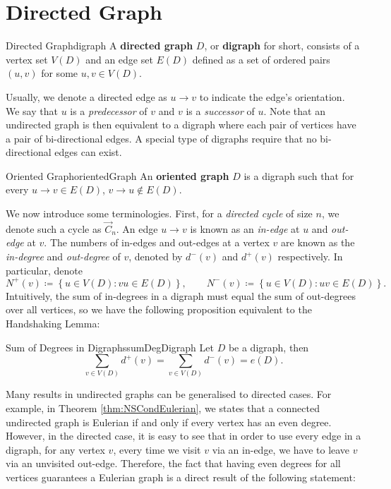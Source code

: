 \documentclass[math, code]{amznotes}
\theoremstyle{remark}
\begin{document}
\section{Directed Graph}
\begin{dfnbox}{Directed Graph}{digraph}
    A {\color{red} \textbf{directed graph}} $D$, or {\color{red} \textbf{digraph}} for short, consists of a vertex set $V(D)$ and an edge set $E(D)$ defined as a set of ordered pairs $(u, v)$ for some $u, v \in V(D)$.
\end{dfnbox}
Usually, we denote a directed edge as $u \to v$ to indicate the edge's orientation. We say that $u$ is a \textit{predecessor} of $v$ and $v$ is a \textit{successor} of $u$. Note that an undirected graph is then equivalent to a digraph where each pair of vertices have a pair of bi-directional edges. A special type of digraphs require that no bi-directional edges can exist.
\begin{dfnbox}{Oriented Graph}{orientedGraph}
    An {\color{red} \textbf{oriented graph}} $D$ is a digraph such that for every $u \to v \in E(D)$, $v \to u \notin E(D)$.
\end{dfnbox}
We now introduce some terminologies. First, for a \textit{directed cycle} of size $n$, we denote such a cycle as $\overrightarrow{C}_n$. An edge $u \to v$ is known as an \textit{in-edge} at $u$ and \textit{out-edge} at $v$. The numbers of in-edges and out-edges at a vertex $v$ are known as the \textit{in-degree} and \textit{out-degree} of $v$, denoted by $d^-(v)$ and $d^+(v)$ respectively. In particular, denote 
\begin{equation*}
    N^+(v) \coloneqq \left\{u \in V(D) \colon vu \in E(D)\right\}, \qquad N^-(v) \coloneqq \left\{u \in V(D) \colon uv \in E(D)\right\}.
\end{equation*}
Intuitively, the sum of in-degrees in a digraph must equal the sum of out-degrees over all vertices, so we have the following proposition equivalent to the Handshaking Lemma:
\begin{probox}{Sum of Degrees in Digraphs}{sumDegDigraph}
    Let $D$ be a digraph, then 
    \begin{equation*}
        \sum_{v \in V(D)}d^+(v) = \sum_{v \in V(D)}d^-(v) = e(D).
    \end{equation*}
\end{probox}
Many results in undirected graphs can be generalised to directed cases. For example, in Theorem \ref{thm:NSCondEulerian}, we states that a connected undirected graph is Eulerian if and only if every vertex has an even degree. However, in the directed case, it is easy to see that in order to use every edge in a digraph, for any vertex $v$, every time we visit $v$ via an in-edge, we have to leave $v$ via an unvisited out-edge. Therefore, the fact that having even degrees for all vertices guarantees a Eulerian graph is a direct result of the following statement:
\end{document}
